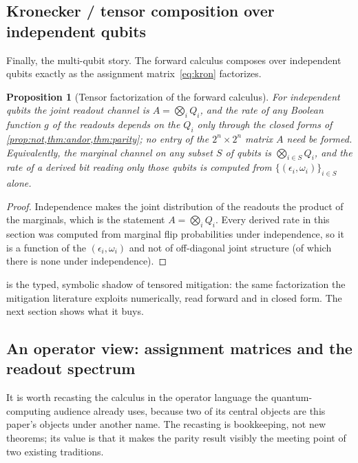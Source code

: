 \documentclass[a4paper,onecolumn,unpublished,nopdfoutputerror,allowtoday]{quantumarticle}
\numberwithin{equation}{section}
\theoremstyle{plain}
\newtheorem{proposition}[theorem]{Proposition}
\theoremstyle{definition}
\theoremstyle{remark}
\newcommand{\eps}{\epsilon}
\begin{document}
\subsection{Kronecker / tensor composition over independent qubits}

Finally, the multi-qubit story. The forward calculus composes over independent
qubits exactly as the assignment matrix~\eqref{eq:kron} factorizes.

\begin{proposition}[Tensor factorization of the forward calculus]
\label{prop:tensor}
For independent qubits the joint readout channel is $A=\bigotimes_i Q_i$, and
the rate of any Boolean function $g$ of the readouts depends on the $Q_i$ only
through the closed forms of \cref{prop:not,thm:andor,thm:parity}; no entry of
the $2^n\times2^n$ matrix $A$ need be formed. Equivalently, the marginal channel
on any subset $S$ of qubits is $\bigotimes_{i\in S} Q_i$, and the rate of a
derived bit reading only those qubits is computed from $\{(\eps_i,\omega_i)\}_{i\in S}$
alone.
\end{proposition}

\begin{proof}
Independence makes the joint distribution of the readouts the product of the
marginals, which is the statement $A=\bigotimes_i Q_i$. Every derived rate in
this section was computed from marginal flip probabilities under independence, so
it is a function of the $(\eps_i,\omega_i)$ and not of off-diagonal joint
structure (of which there is none under independence).
\end{proof}

 is the typed, symbolic shadow of tensored mitigation: the same
factorization the mitigation literature exploits numerically, read forward and in
closed form. The next section shows what it buys.

\subsection{An operator view: assignment matrices and the readout spectrum}
\label{sec:operator}

It is worth recasting the calculus in the operator language the
quantum-computing audience already uses, because two of its central objects are
this paper's objects under another name. The recasting is bookkeeping, not new
theorems; its value is that it makes the parity result visibly the meeting point
of two existing traditions.
\end{document}
